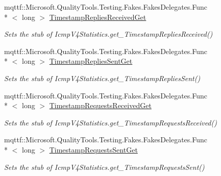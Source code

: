 \begin{DoxyCompactItemize}
mqttf\-::\-Microsoft.\-Quality\-Tools.\-Testing.\-Fakes.\-Fakes\-Delegates.\-Func\\*
$<$ long $>$ \hyperlink{class_system_1_1_net_1_1_network_information_1_1_fakes_1_1_stub_icmp_v4_statistics_af38cff5c15e50d66862f8182d35535c4}{Timestamp\-Replies\-Received\-Get}
\begin{DoxyCompactList}\small\item\em Sets the stub of Icmp\-V4\-Statistics.\-get\-\_\-\-Timestamp\-Replies\-Received()\end{DoxyCompactList}\item 
mqttf\-::\-Microsoft.\-Quality\-Tools.\-Testing.\-Fakes.\-Fakes\-Delegates.\-Func\\*
$<$ long $>$ \hyperlink{class_system_1_1_net_1_1_network_information_1_1_fakes_1_1_stub_icmp_v4_statistics_ab72b48e0584425357fe9412006648b64}{Timestamp\-Replies\-Sent\-Get}
\begin{DoxyCompactList}\small\item\em Sets the stub of Icmp\-V4\-Statistics.\-get\-\_\-\-Timestamp\-Replies\-Sent()\end{DoxyCompactList}\item 
mqttf\-::\-Microsoft.\-Quality\-Tools.\-Testing.\-Fakes.\-Fakes\-Delegates.\-Func\\*
$<$ long $>$ \hyperlink{class_system_1_1_net_1_1_network_information_1_1_fakes_1_1_stub_icmp_v4_statistics_a078a420dc01d0f5a87bca8c3f518d362}{Timestamp\-Requests\-Received\-Get}
\begin{DoxyCompactList}\small\item\em Sets the stub of Icmp\-V4\-Statistics.\-get\-\_\-\-Timestamp\-Requests\-Received()\end{DoxyCompactList}\item 
mqttf\-::\-Microsoft.\-Quality\-Tools.\-Testing.\-Fakes.\-Fakes\-Delegates.\-Func\\*
$<$ long $>$ \hyperlink{class_system_1_1_net_1_1_network_information_1_1_fakes_1_1_stub_icmp_v4_statistics_ad6a6883344dc5240ef94cbec3ea5615d}{Timestamp\-Requests\-Sent\-Get}
\begin{DoxyCompactList}\small\item\em Sets the stub of Icmp\-V4\-Statistics.\-get\-\_\-\-Timestamp\-Requests\-Sent()\end{DoxyCompactList}\end{DoxyCompactItemize}
